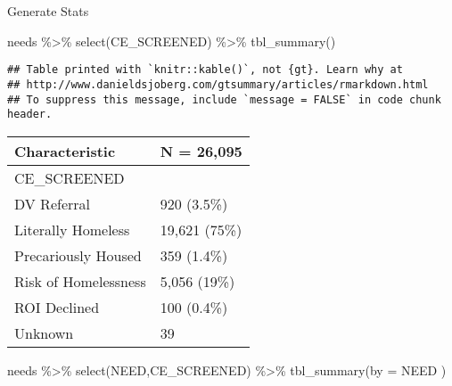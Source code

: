 \documentclass[
]{article}
\newenvironment{Shaded}{\begin{snugshade}}{\end{snugshade}}
\newcommand{\AttributeTok}[1]{\textcolor[rgb]{0.77,0.63,0.00}{#1}}
\newcommand{\FunctionTok}[1]{\textcolor[rgb]{0.00,0.00,0.00}{#1}}
\newcommand{\NormalTok}[1]{#1}
\newcommand{\OtherTok}[1]{\textcolor[rgb]{0.56,0.35,0.01}{#1}}
\newcommand{\SpecialCharTok}[1]{\textcolor[rgb]{0.00,0.00,0.00}{#1}}
\newcommand{\StringTok}[1]{\textcolor[rgb]{0.31,0.60,0.02}{#1}}
\begin{document}
\begin{Shaded}
\end{Shaded}

Generate Stats

\begin{Shaded}
\begin{Highlighting}[]
\NormalTok{needs }\SpecialCharTok{\%\textgreater{}\%} \FunctionTok{select}\NormalTok{(CE\_SCREENED) }\SpecialCharTok{\%\textgreater{}\%} \FunctionTok{tbl\_summary}\NormalTok{()}
\end{Highlighting}
\end{Shaded}

\begin{verbatim}
## Table printed with `knitr::kable()`, not {gt}. Learn why at
## http://www.danieldsjoberg.com/gtsummary/articles/rmarkdown.html
## To suppress this message, include `message = FALSE` in code chunk header.
\end{verbatim}

\begin{longtable}[]{@{}ll@{}}
\toprule
\textbf{Characteristic} & \textbf{N = 26,095} \\
\midrule
\endhead
CE\_SCREENED & \\
DV Referral & 920 (3.5\%) \\
Literally Homeless & 19,621 (75\%) \\
Precariously Housed & 359 (1.4\%) \\
Risk of Homelessness & 5,056 (19\%) \\
ROI Declined & 100 (0.4\%) \\
Unknown & 39 \\
\bottomrule
\end{longtable}

\begin{Shaded}
\begin{Highlighting}[]
\NormalTok{needs }\SpecialCharTok{\%\textgreater{}\%} \FunctionTok{select}\NormalTok{(NEED,CE\_SCREENED) }\SpecialCharTok{\%\textgreater{}\%} \FunctionTok{tbl\_summary}\NormalTok{(}\AttributeTok{by =}\NormalTok{ NEED )}
\end{Highlighting}
\end{Shaded}
\end{document}
